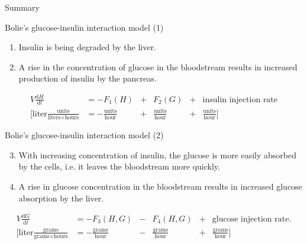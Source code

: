 \documentclass{beamer}
\providecommand{\m}[1]{\ensuremath{\mathrm{#1}}}
\begin{document}
\begin{frame}{Summary}

\end{frame}

\begin{frame}{ }

\end{frame}

\begin{frame}{Bolie's glucose-insulin interaction model (1)}

\begin{enumerate}
	\item
	Insulin is being degraded by the liver.	
	\item
	A rise in the concentration of glucose in the 			bloodstream results in increased production of 			insulin by the pancreas.
\end{enumerate}

\begin{align*}
V\frac{\m{d} H}{\m{d} t}&=-F_1(H)&+&F_2(G)&+ &\text{insulin injection rate}\\
\Bigg[\text{liter}\frac{\text{units}}{\text{liters} \times\text{hours}}&=-\frac{\text{units}}{\text{hour}}&+&\frac{\text{units}}{\text{hour}}&+&\frac{\text{units}}{\text{hour}}\Bigg]
\end{align*}



\end{frame}

\begin{frame}{Bolie's glucose-insulin interaction model (2)}

\begin{enumerate}
\setcounter{enumi}{2}
	\item
	With increasing concentration of insulin, the glucose is more easily absorbed by the cells, i.e. it leaves the bloodstream more quickly.
	\item
	A rise in glucose concentration in the bloodstream results in increased glucose absorption by the liver.
\end{enumerate}

\begin{align*}
V\frac{\m{d} G}{\m{d} t}&=-F_3(H,G)&-&F_4(H,G) &+&\text{glucose injection rate}.\\
\Bigg[\text{liter}\frac{\text{grams}}{\text{grams} \times\text{hours}}&=-\frac{\text{grams}}{\text{hour}}&-&\frac{\text{grams}}{\text{hour}}&+&\frac{\text{grams}}{\text{hour}}\Bigg]
\end{align*}


\end{frame}
\end{document}
